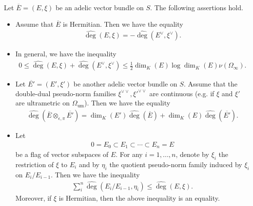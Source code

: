 \documentclass [11pt,reqno]{amsart}
\newcommand{\1}{\mathmybb{1}}
\def\um{\operatorname{um}}
\begin{document}
\begin{proposition}
\label{prop:CM_4.3.2}
Let $\overline{E}=(E,\xi)$ be an adelic vector bundle on $S$. The following assertions hold.
\begin{itemize}		
	\item[(1)] Assume that $\overline{E}$ is Hermitian. Then we have the equality
	\begin{align*}
	\widehat{\deg}(E,\xi) = - \widehat{\deg}(E^{\vee},\xi^{\vee}).
	\end{align*}
	\item[(2)] In general, we have the inequality 
	\begin{align*}
	0 \leq \widehat{\deg}(E,\xi) + \widehat{\deg}(E^{\vee},\xi^{\vee}) \leq \frac{1}{2}\dim_{K}(E)\log\dim_{K}(E)\nu(\Omega_{\infty}).
	\end{align*}
	\item[(3)] Let $\overline{E'}=(E',\xi')$ be another adelic vector bundle on $S$. Assume that the double-dual pseudo-norm families $\xi^{\vee\vee},\xi'^{\vee\vee}$ are continuous (e.g. if $\xi$ and $\xi'$ are ultrametric on $\Omega_{\um}$). Then we have the equality
	\begin{align*}
	\widehat{\deg}(\overline{E}\otimes_{\epsilon,\pi}\overline{E'}) = \dim_{K}(E')\widehat{\deg}(\overline{E}) + \dim_{K}(E)\widehat{\deg}(\overline{E'}).
	\end{align*}
	\item[(4)] Let 
	\begin{align*}
	0 = E_0 \subset E_1 \subset \cdots \subset E_n = E
	\end{align*}
be a flag of vector subspaces of $E$. For any $i=1,...,n$, denote by $\xi_i$ the restriction of $\xi$ to $E_i$ and by $\eta_{i}$ the quotient pseudo-norm family induced by $\xi_i$ on $E_{i}/E_{i-1}$. Then  we have the inequality
\begin{align*}
\displaystyle\sum_{i}^{n} \widehat{\deg}(E_i/E_{i-1},\eta_i) \leq \widehat{\deg}(E,\xi).
\end{align*}
Moreover, if $\xi$ is Hermitian, then the above inequality is an equality.
\end{itemize}
\end{proposition}
\end{document}
